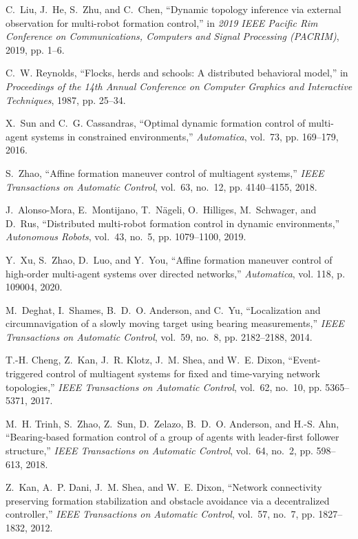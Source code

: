 \documentclass[12pt,journal,draftclsnofoot,onecolumn]{IEEEtran}
\begin{document}
\begin{thebibliography}{10}
C.~{Liu}, J.~{He}, S.~{Zhu}, and C.~{Chen}, ``Dynamic topology inference via
  external observation for multi-robot formation control,'' in \emph{2019 IEEE
  Pacific Rim Conference on Communications, Computers and Signal Processing
  (PACRIM)}, 2019, pp. 1--6.

C.~W. Reynolds, ``Flocks, herds and schools: A distributed behavioral model,''
  in \emph{Proceedings of the 14th Annual Conference on Computer Graphics and
  Interactive Techniques}, 1987, pp. 25--34.

X.~Sun and C.~G. Cassandras, ``Optimal dynamic formation control of multi-agent
  systems in constrained environments,'' \emph{Automatica}, vol.~73, pp.
  169--179, 2016.

S.~Zhao, ``Affine formation maneuver control of multiagent systems,''
  \emph{IEEE Transactions on Automatic Control}, vol.~63, no.~12, pp.
  4140--4155, 2018.

J.~Alonso-Mora, E.~Montijano, T.~N{\"a}geli, O.~Hilliges, M.~Schwager, and
  D.~Rus, ``Distributed multi-robot formation control in dynamic
  environments,'' \emph{Autonomous Robots}, vol.~43, no.~5, pp. 1079--1100,
  2019.

Y.~Xu, S.~Zhao, D.~Luo, and Y.~You, ``Affine formation maneuver control of
  high-order multi-agent systems over directed networks,'' \emph{Automatica},
  vol. 118, p. 109004, 2020.

M.~Deghat, I.~Shames, B.~D.~O. Anderson, and C.~Yu, ``Localization and
  circumnavigation of a slowly moving target using bearing measurements,''
  \emph{IEEE Transactions on Automatic Control}, vol.~59, no.~8, pp.
  2182--2188, 2014.

T.-H. Cheng, Z.~Kan, J.~R. Klotz, J.~M. Shea, and W.~E. Dixon,
  ``Event-triggered control of multiagent systems for fixed and time-varying
  network topologies,'' \emph{IEEE Transactions on Automatic Control}, vol.~62,
  no.~10, pp. 5365--5371, 2017.

M.~H. Trinh, S.~Zhao, Z.~Sun, D.~Zelazo, B.~D.~O. Anderson, and H.-S. Ahn,
  ``Bearing-based formation control of a group of agents with leader-first
  follower structure,'' \emph{IEEE Transactions on Automatic Control}, vol.~64,
  no.~2, pp. 598--613, 2018.

Z.~Kan, A.~P. Dani, J.~M. Shea, and W.~E. Dixon, ``Network connectivity
  preserving formation stabilization and obstacle avoidance via a decentralized
  controller,'' \emph{IEEE Transactions on Automatic Control}, vol.~57, no.~7,
  pp. 1827--1832, 2012.


\end{thebibliography}
\end{document}
